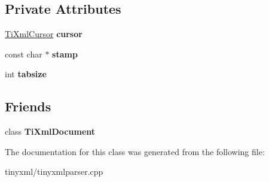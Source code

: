 \subsection*{\-Private \-Attributes}
\begin{DoxyCompactItemize}
\item 
\hypertarget{class_ti_xml_parsing_data_abee4c6c657f595182a4f8beda4fa1c7d}{\hyperlink{struct_ti_xml_cursor}{\-Ti\-Xml\-Cursor} {\bfseries cursor}}\label{class_ti_xml_parsing_data_abee4c6c657f595182a4f8beda4fa1c7d}

\item 
\hypertarget{class_ti_xml_parsing_data_a0e3c2ea5a8b738d733735ca0318fe4ff}{const char $\ast$ {\bfseries stamp}}\label{class_ti_xml_parsing_data_a0e3c2ea5a8b738d733735ca0318fe4ff}

\item 
\hypertarget{class_ti_xml_parsing_data_ab9d6aea2833e38aaef440e49c22a05ca}{int {\bfseries tabsize}}\label{class_ti_xml_parsing_data_ab9d6aea2833e38aaef440e49c22a05ca}

\end{DoxyCompactItemize}
\subsection*{\-Friends}
\begin{DoxyCompactItemize}
\item 
\hypertarget{class_ti_xml_parsing_data_a173617f6dfe902cf484ce5552b950475}{class {\bfseries \-Ti\-Xml\-Document}}\label{class_ti_xml_parsing_data_a173617f6dfe902cf484ce5552b950475}

\end{DoxyCompactItemize}


\-The documentation for this class was generated from the following file\-:\begin{DoxyCompactItemize}
\item 
tinyxml/tinyxmlparser.\-cpp\end{DoxyCompactItemize}
